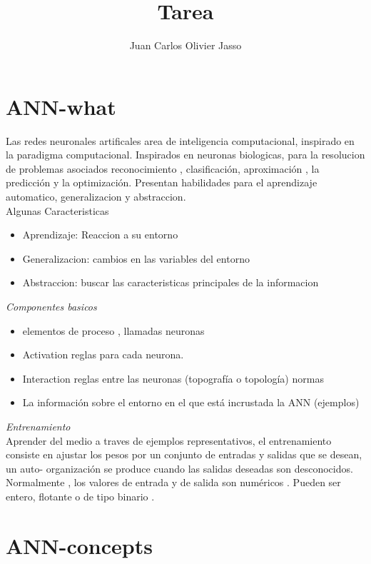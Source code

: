 \documentclass[11pt]{article}
\title{\textbf{Tarea}}
\author{Juan Carlos Olivier Jasso}
\date{}
\begin{document}
\maketitle

\section{ANN-what}
Las redes neuronales artificales area de inteligencia computacional, inspirado en la paradigma computacional. Inspirados en neuronas biologicas, para la resolucion de problemas asociados reconocimiento , clasificación, aproximación , la predicción y la optimización. Presentan habilidades para el aprendizaje automatico, generalizacion y abstraccion.\\
Algunas Caracteristicas 	

\begin{itemize}
\item Aprendizaje: Reaccion a su entorno
\item Generalizacion: cambios en las variables del entorno
\item Abstraccion: buscar las caracteristicas principales de la informacion
\end{itemize}

\emph{Componentes basicos}

\begin{itemize}
\item elementos de proceso , llamadas neuronas
\item Activation reglas para cada neurona.
\item Interaction reglas entre las neuronas (topografía o topología) normas 
\item La información sobre el entorno en el que está incrustada la ANN (ejemplos)
\end{itemize}

\emph{Entrenamiento}\\ 
Aprender del medio a traves de ejemplos representativos, el entrenamiento consiste en ajustar los pesos por un conjunto de entradas y salidas que se desean, un auto- organización se produce cuando las salidas deseadas son desconocidos.
Normalmente , los valores de entrada y de salida son numéricos . Pueden ser entero, flotante o de tipo binario .

\newpage

\section{ANN-concepts}
\end{document}
